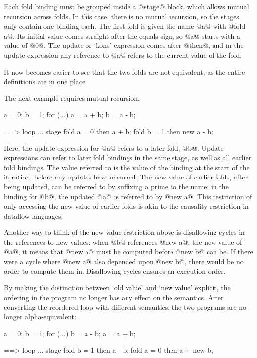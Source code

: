 Each fold binding must be grouped inside a @stage@ block, which allows mutual recursion across folds.
In this case, there is no mutual recursion, so the stages only contain one binding each.
The first fold is given the name @a@ with @fold a@.
Its initial value comes straight after the equals sign, so @a@ starts with a value of @0@.
The update or `kons' expression comes after @then@, and in the update expression any reference to @a@ refers to the current value of the fold.

It now becomes easier to see that the two folds are not equivalent, as the entire definitions are in one place.

The next example requires mutual recursion.
\begin{code}
a = 0;
b = 1;
for (...) {
  a = a + b;
  b = a - b;
}

==>
loop ... {
  stage {
    fold a = 0
        then a + b;
    fold b = 1
        then new a - b;
  }
}
\end{code}

Here, the update expression for @a@ refers to a later fold, @b@.
Update expressions can refer to later fold bindings in the same stage, as well as all earlier fold bindings.
The value referred to is the value of the binding at the start of the iteration, before any updates have occurred.
The new value of earlier folds, after being updated, can be referred to by suffixing a prime to the name: in the binding for @b@, the updated @a@ is referred to by @new a@.
This restriction of only accessing the new value of earlier folds is akin to the causality restriction in dataflow languages\cite{mandel2010lucy}.

Another way to think of the new value restriction above is disallowing cycles in the references to new values:
when @b@ references @new a@, the new value of @a@, it means that @new a@ must be computed before @new b@ can be.
If there were a cycle where @new a@ also depended upon @new b@, there would be no order to compute them in.
Disallowing cycles ensures an execution order.

By making the distinction between `old value' and `new value' explicit, the ordering in the program no longer has any effect on the semantics.
After converting the reordered loop with different semantics, the two programs are no longer alpha-equivalent:
\begin{code}
a = 0;
b = 1;
for (...) {
  b = a - b;
  a = a + b;
}

==>
loop ... {
  stage {
    fold b = 1
        then a - b;
    fold a = 0
        then a + new b;
  }
}
\end{code}

